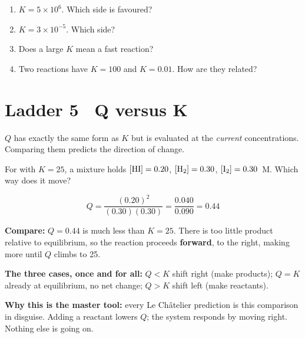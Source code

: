 \documentclass{apchem-worksheet}
\begin{document}
\begin{yourturn}
\begin{enumerate}[leftmargin=*,itemsep=0.5em]
  \item $K = 5\times10^{6}$. Which side is favoured?
        \workspace[1.4cm]
  \item $K = 3\times10^{-5}$. Which side? \workspace[1.4cm]
  \item Does a large $K$ mean a fast reaction? \workspace[1.6cm]
  \item Two reactions have $K = 100$ and $K = 0.01$. How are they
        related? \workspace[1.6cm]
\end{enumerate}
\end{yourturn}

\section*{\sffamily Ladder 5 \textbullet\ Q versus K}
 

$Q$ has exactly the same form as $K$ but is evaluated at the
\emph{current} concentrations. Comparing them predicts the direction of
change.

\begin{workedexample}
For  with $K = 25$, a mixture holds
$[\ce{HI}] = 0.20$, $[\ce{H2}] = 0.30$,
$[\ce{I2}] = 0.30$~M. Which way does it move?

\[ Q = \frac{(0.20)^2}{(0.30)(0.30)} = \frac{0.040}{0.090}
   = \mathbf{0.44} \]

\textbf{Compare:} $Q = 0.44$ is much less than $K = 25$. There is too
little product relative to equilibrium, so the reaction proceeds
\textbf{forward}, to the right, making more  until $Q$ climbs to
25.

\textbf{The three cases, once and for all:}
$Q < K$ shift right (make products);
$Q = K$ already at equilibrium, no net change;
$Q > K$ shift left (make reactants).

\textbf{Why this is the master tool:} every Le Ch\^{a}telier prediction is
this comparison in disguise. Adding a reactant lowers $Q$; the system
responds by moving right. Nothing else is going on.
\end{workedexample}
\end{document}
